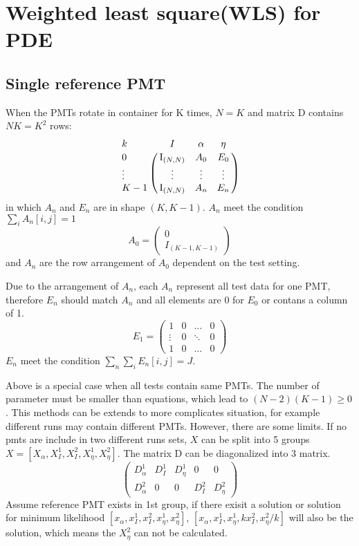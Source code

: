 \section{Weighted least square(WLS) for PDE}
\label{sec:solution}
\subsection{Single reference PMT}
\label{sec:singlepmt}
When the PMTs rotate in container for K times, $N=K$ and matrix D contains $NK=K^2$ rows:
\begin{equation}
    \bordermatrix{
        k&I&\alpha&\eta\cr
        0&\mathrm{I}_{(N,N)}&A_{0}&E_{0}\cr
        \vdots&\vdots&\vdots&\vdots\cr
        K-1&\mathrm{I}_{(N,N)}&A_{n}&E_{n}
    }
\end{equation}
in which $A_n$ and $E_n$ are in shape $(K,K-1)$. $A_n$ meet the condition $\sum_i{A_n[i,j]}=1$
\begin{equation}
    A_0=\begin{pmatrix}
        0\\
        I_{(K-1,K-1)}
    \end{pmatrix}
\end{equation}
and $A_n$ are the row arrangement of $A_0$ dependent on the test setting.

Due to the arrangement of $A_n$, each $A_n$ represent all test data for one PMT, therefore $E_n$ should match $A_n$ and all elements are 0 for $E_0$ or contans a column of 1.
\begin{equation}
    E_1=\begin{pmatrix}
        1&0&\dots&0\\
        \vdots&0&\ddots&0\\
        1&0&\dots&0
    \end{pmatrix}
\end{equation}
$E_n$ meet the condition $\sum_n{\sum_i{E_n[i,j]}}=J$.

Above is a special case when all tests contain same PMTs. The number of parameter must be smaller than equations, which lead to $(N-2)(K-1)\geq0$. This methods can be extends to more complicates situation, for example different runs may contain different PMTs. However, there are some limits. If no pmts are include in two different runs sets, $X$ can be split into 5 groups $X=[X_\alpha, X^1_I,X^2_I,X^1_\eta,X^2_\eta]$. The matrix D can be diagonalized into 3 matrix. 
\begin{equation}
    \begin{pmatrix}
        D^1_\alpha&D^1_I&D^1_\eta&0&0\\
        D^2_\alpha&0&0&D^2_I&D^2_\eta
    \end{pmatrix}
\end{equation}
Assume reference PMT exists in 1st group, if there exisit a solution or solution for minimum likelihood $[x_\alpha,x^1_I,x^2_I,x^1_\eta,x^2_\eta]$, $[x_\alpha,x^1_I,x^1_\eta,kx^2_I,x^2_\eta/k]$ will also be the solution, which means the $X^2_\eta$ can not be calculated.
